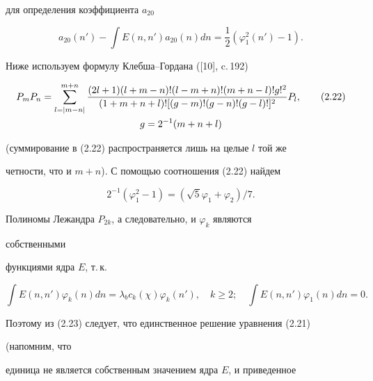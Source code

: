 для определения коэффициента $a_{20}$ 


\begin{equation} 


a_{20}(n')-\int E(n,n')a_{20}(n)dn=\frac{1}{2} 


(\varphi^2_1(n')-1).\tag{2.21} 


\end{equation} 


 


Ниже используем формулу Клебша--Гордана ([10], c.\,192) 


\begin{gather} 


P_m P_n=\sum^{m+n}_{l=|m-n|} 


\frac{(2l+1)(l+m-n)!(l-m+n)!(m+n-l)!g!^2} 


{(1+m+n+l)![(g-m)!(g-n)!(g-l)!]^2}P_l,\tag{2.22}\\ 


g=2^{-1}(m+n+l)\notag 


\end{gather} 


(суммирование в (2.22) распространяется лишь на целые $l$ той же 


четности, что и $m+n$). С помощью соотношения (2.22) найдем 


\begin{equation} 


2^{-1}(\varphi^2_1-1)=(\sqrt{5}\varphi_1+\varphi_2)/7.\tag{2.23} 


\end{equation} 


Полиномы Лежандра $P_{2k}$, а следовательно, и $\varphi_k$ являются 


собственными 


функциями ядра $E$, т.\,к. 


\begin{equation} 


\int E(n,n')\varphi_k(n)dn=\lambda_b c_k(\chi) 


\varphi_k(n'),\quad k\ge 2;\quad 


\int E(n,n')\varphi_1(n)dn=0.\tag{2.24} 


\end{equation} 


Поэтому из (2.23) следует, что единственное решение уравнения (2.21) 


(напомним, что  


единица не является собственным значением ядра $E$, и приведенное  


